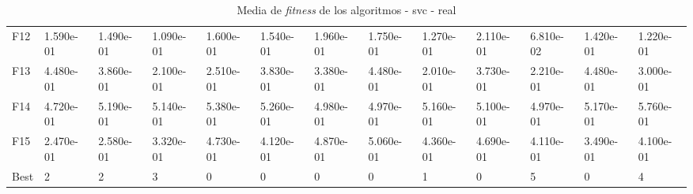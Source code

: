\begin{table}
\begin{adjustbox}{width=\linewidth}
\begin{tabular}{lllllllllllll}
            F12  & 1.590e-01 & 1.490e-01 & 1.090e-01 & 1.600e-01 & 1.540e-01 & 1.960e-01 & 1.750e-01 & 1.270e-01 & 2.110e-01 & 6.810e-02 & 1.420e-01 & 1.220e-01 \\
            F13  & 4.480e-01 & 3.860e-01 & 2.100e-01 & 2.510e-01 & 3.830e-01 & 3.380e-01 & 4.480e-01 & 2.010e-01 & 3.730e-01 & 2.210e-01 & 4.480e-01 & 3.000e-01 \\
            F14  & 4.720e-01 & 5.190e-01 & 5.140e-01 & 5.380e-01 & 5.260e-01 & 4.980e-01 & 4.970e-01 & 5.160e-01 & 5.100e-01 & 4.970e-01 & 5.170e-01 & 5.760e-01 \\
            F15  & 2.470e-01 & 2.580e-01 & 3.320e-01 & 4.730e-01 & 4.120e-01 & 4.870e-01 & 5.060e-01 & 4.360e-01 & 4.690e-01 & 4.110e-01 & 3.490e-01 & 4.100e-01 \\
            Best & 2         & 2         & 3         & 0         & 0         & 0         & 0         & 1         & 0         & 5         & 0         & 4         \\
            \bottomrule
        \end{tabular}
    \end{adjustbox}
    \caption{Media de \textit{fitness} de los algoritmos - svc - real}
    \label{tab:mean_fitness_real_svc}
\end{table}

